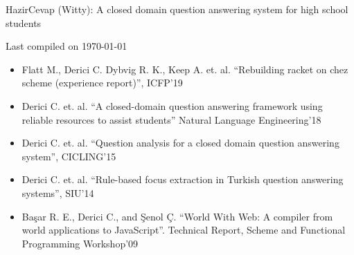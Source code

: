 \documentclass[9pt,a4paper]{article} %
\begin{document}

\headedsection %
{}
{} {
\vspace{-0.4cm}
\headedsubsection %
{}
{}
{\small{}}
}

\headedsection %
{}
{} {
\vspace{-0.4cm}
\headedsubsection %
{HazirCevap (Witty): A closed domain question answering system for high school students}
{}
{\small{}}
}

\vfill \hfill \small Last compiled on \today

\newpage

\spacedhrule{0.5em}{-0.4em} %



\begin{itemize}
\item Flatt M., Derici C. Dybvig R. K., Keep A. et. al. “Rebuilding racket on chez scheme (experience report)”, ICFP'19

\item Derici C. et. al. “A closed-domain question answering framework using reliable resources to assist students” \newline Natural Language Engineering'18

\item Derici C. et. al. “Question analysis for a closed domain question answering system”, CICLING'15

\item Derici C. et. al. “Rule-based focus extraction in Turkish question answering systems”, SIU'14

\item Başar R. E., Derici C., and Şenol Ç. “World With Web: A compiler from world applications to JavaScript”. Technical Report, Scheme and Functional Programming Workshop'09
\end{itemize}
\end{document}
